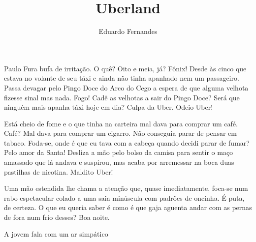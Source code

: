 \documentclass[12pt]{creativeWriting}
\title{Uberland}
\author{Eduardo Fernandes}
\begin{document}
\maketitle

Paulo Fura bufa de irritação. O quê? Oito e meia, já? Fônix! Desde às cinco que estava no volante de seu táxi e ainda não tinha apanhado nem um passageiro. Passa devagar pelo Pingo Doce do Arco do Cego a espera de que alguma velhota fizesse sinal mas nada. Fogo! Cadê as velhotas a sair do Pingo Doce? Será que ninguém mais apanha táxi hoje em dia? Culpa da Uber. Odeio Uber!

Está cheio de fome e o que tinha na carteira mal dava para comprar um café. Café? Mal dava para comprar um cigarro. Não conseguia parar de pensar em tabaco. Foda-se, onde é que eu tava com a cabeça quando decidi parar de fumar? Pelo amor da Santa! Desliza a mão pelo bolso da camisa para sentir o maço amassado que lá andava e suspirou, mas acaba por arremessar na boca duas pastilhas de nicotina. Maldito Uber!

Uma mão estendida lhe chama a atenção que, quase imediatamente, foca-se num rabo espetacular colado a uma saia minúscula com padrões de oncinha. É puta, de certeza. O que eu queria saber é como é que gaja aguenta andar com as pernas de fora num frio desses? Boa noite.

 A jovem fala com um ar simpático 











\end{document}
